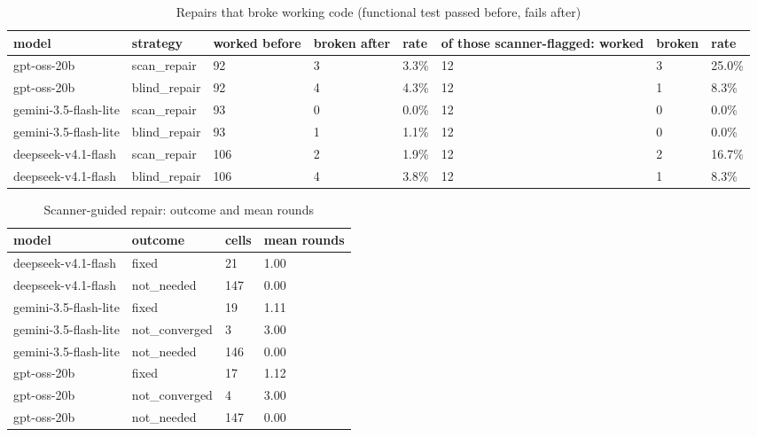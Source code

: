 \begin{table}[t]\centering\small
\caption{Repairs that broke working code (functional test passed before, fails after)}
\begin{tabular}{llllllll}
\toprule
model & strategy & worked before & broken after & rate & of those scanner-flagged: worked & broken & rate \\
\midrule
gpt-oss-20b & scan\_repair & 92 & 3 & 3.3\% & 12 & 3 & 25.0\% \\
gpt-oss-20b & blind\_repair & 92 & 4 & 4.3\% & 12 & 1 & 8.3\% \\
gemini-3.5-flash-lite & scan\_repair & 93 & 0 & 0.0\% & 12 & 0 & 0.0\% \\
gemini-3.5-flash-lite & blind\_repair & 93 & 1 & 1.1\% & 12 & 0 & 0.0\% \\
deepseek-v4.1-flash & scan\_repair & 106 & 2 & 1.9\% & 12 & 2 & 16.7\% \\
deepseek-v4.1-flash & blind\_repair & 106 & 4 & 3.8\% & 12 & 1 & 8.3\% \\
\bottomrule
\end{tabular}
\end{table}
\begin{table}[t]\centering\small
\caption{Scanner-guided repair: outcome and mean rounds}
\begin{tabular}{llll}
\toprule
model & outcome & cells & mean rounds \\
\midrule
deepseek-v4.1-flash & fixed & 21 & 1.00 \\
deepseek-v4.1-flash & not\_needed & 147 & 0.00 \\
gemini-3.5-flash-lite & fixed & 19 & 1.11 \\
gemini-3.5-flash-lite & not\_converged & 3 & 3.00 \\
gemini-3.5-flash-lite & not\_needed & 146 & 0.00 \\
gpt-oss-20b & fixed & 17 & 1.12 \\
gpt-oss-20b & not\_converged & 4 & 3.00 \\
gpt-oss-20b & not\_needed & 147 & 0.00 \\
\bottomrule
\end{tabular}
\end{table}
